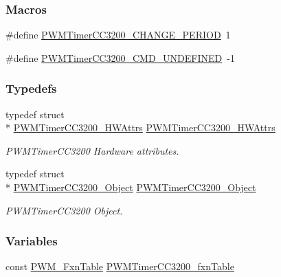 \subsubsection*{Macros}
\begin{DoxyCompactItemize}
\item 
\#define \hyperlink{_p_w_m_timer_c_c3200_8h_aec237c3c3e2a1f975437d65cae9bf004}{P\-W\-M\-Timer\-C\-C3200\-\_\-\-C\-H\-A\-N\-G\-E\-\_\-\-P\-E\-R\-I\-O\-D}~1
\item 
\#define \hyperlink{_p_w_m_timer_c_c3200_8h_a24d2e7e4523bf9762a1e33ef29c3a7d2}{P\-W\-M\-Timer\-C\-C3200\-\_\-\-C\-M\-D\-\_\-\-U\-N\-D\-E\-F\-I\-N\-E\-D}~-\/1
\end{DoxyCompactItemize}
\subsubsection*{Typedefs}
\begin{DoxyCompactItemize}
\item 
typedef struct \\*
\hyperlink{struct_p_w_m_timer_c_c3200___h_w_attrs}{P\-W\-M\-Timer\-C\-C3200\-\_\-\-H\-W\-Attrs} \hyperlink{_p_w_m_timer_c_c3200_8h_aa7bd34f367c1c6cb5b06d68a5942bbec}{P\-W\-M\-Timer\-C\-C3200\-\_\-\-H\-W\-Attrs}
\begin{DoxyCompactList}\small\item\em P\-W\-M\-Timer\-C\-C3200 Hardware attributes. \end{DoxyCompactList}\item 
typedef struct \\*
\hyperlink{struct_p_w_m_timer_c_c3200___object}{P\-W\-M\-Timer\-C\-C3200\-\_\-\-Object} \hyperlink{_p_w_m_timer_c_c3200_8h_aab5de96f9cb61cd9fad8c91c02fb591a}{P\-W\-M\-Timer\-C\-C3200\-\_\-\-Object}
\begin{DoxyCompactList}\small\item\em P\-W\-M\-Timer\-C\-C3200 Object. \end{DoxyCompactList}\end{DoxyCompactItemize}
\subsubsection*{Variables}
\begin{DoxyCompactItemize}
\item 
const \hyperlink{struct_p_w_m___fxn_table}{P\-W\-M\-\_\-\-Fxn\-Table} \hyperlink{_p_w_m_timer_c_c3200_8h_a59acce71ed10f39839edb1a310c6b385}{P\-W\-M\-Timer\-C\-C3200\-\_\-fxn\-Table}
\end{DoxyCompactItemize}


